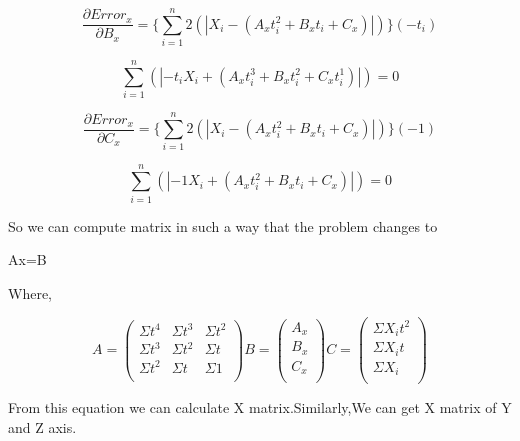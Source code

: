 \begin{equation} 
 \frac{\partial Error_x}{\partial B_x} = {\lbrace\displaystyle\sum_{i=1}^{n}2(|X_i-(A_xt_i^2+B_x t_i +C_x)|)\rbrace}({-t_i})
\end{equation}

\begin{equation} 
\displaystyle\sum_{i=1}^{n}(|{-t_i}X_i+(A_x t_i^3+B_x t_i^2+C_x t_i^1)|) = 0
\end{equation}

\begin{equation} 
 \frac{\partial Error_x}{\partial C_x} = {\lbrace\displaystyle\sum_{i=1}^{n}2(|X_i-(A_xt_i^2+B_x t_i +C_x)|)\rbrace}({-1})
\end{equation}

\begin{equation} 
\displaystyle\sum_{i=1}^{n}(|{-1}X_i+(A_x t_i^2+B_x t_i+C_x)|) = 0
\end{equation}

So we can compute matrix in such a way that the problem changes to 

Ax=B

Where, 

\begin{equation}
A = 
\begin{pmatrix}
  \Sigma t^4 & \Sigma t^3 & \Sigma t^2\\
  \Sigma t^3 & \Sigma t^2 & \Sigma t\\
  \Sigma t^2 & \Sigma t & \Sigma 1\\
 \end{pmatrix}
B = 
\begin{pmatrix}
  A_x \\
  B_x \\
  C_x \\
 \end{pmatrix}
 C = 
\begin{pmatrix}
  \Sigma X_i t ^2 \\
  \Sigma X_i t \\
  \Sigma X_i \\
 \end{pmatrix}
\end{equation}

From this equation we can calculate X matrix.Similarly,We can get X matrix of Y and Z axis.

